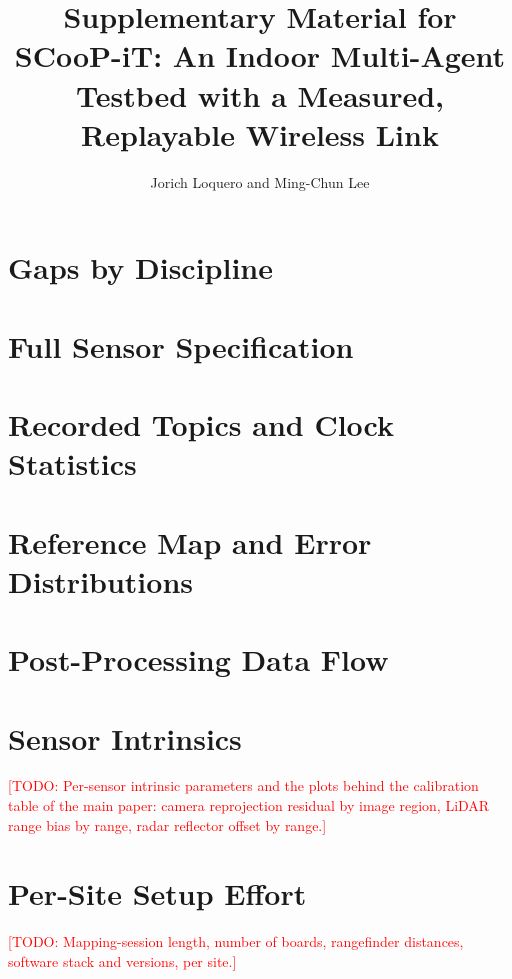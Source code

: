 \documentclass[journal]{IEEEtran}
\newcommand{\todo}[1]{\textcolor{red}{[TODO: #1]}}
\begin{document}
\title{Supplementary Material for\\SCooP-iT: An Indoor Multi-Agent Testbed with a Measured, Replayable Wireless Link}
\author{Jorich Loquero and Ming-Chun Lee}
\maketitle

\section{Gaps by Discipline}


\section{Full Sensor Specification}


\section{Recorded Topics and Clock Statistics}



\section{Reference Map and Error Distributions}







\section{Post-Processing Data Flow}


\section{Sensor Intrinsics}
\todo{Per-sensor intrinsic parameters and the plots behind the
calibration table of the main paper: camera reprojection residual by
image region, LiDAR range bias by range, radar reflector offset by
range.}
%

\section{Per-Site Setup Effort}
\todo{Mapping-session length, number of boards, rangefinder distances,
software stack and versions, per site.}



\end{document}
